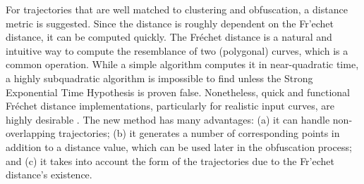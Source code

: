For trajectories that are well matched to clustering and obfuscation, a distance metric is suggested. Since the distance is roughly dependent on the Fr'{e}chet distance, it can be computed quickly. The Fréchet distance is a natural and intuitive way to compute the resemblance of two (polygonal) curves, which is a common operation. While a simple algorithm computes it in near-quadratic time, a highly subquadratic algorithm is impossible to find unless the Strong Exponential Time Hypothesis is proven false. Nonetheless, quick and functional Fréchet distance implementations, particularly for realistic input curves, are highly desirable \cite{sharma2019map}. The new method has many advantages: (a) it can handle non-overlapping trajectories; (b) it generates a number of corresponding points in addition to a distance value, which can be used later in the obfuscation process; and (c) it takes into account the form of the trajectories due to the Fr'{e}chet distance's existence.
